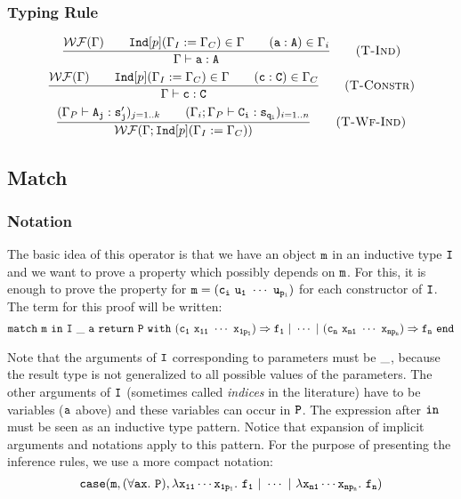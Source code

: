 \subsubsection{Typing Rule}
\begin{equation*}
\frac{\mathcal{WF}(\Gamma)\qquad {\tt Ind}[p](\Gamma_I:=\Gamma_C)\in \Gamma\qquad {\tt(a:A)}\in\Gamma_i}
    {\Gamma\vdash\tt a:A}
    \tag{\sc T-Ind}
\end{equation*}
\begin{equation*}
\frac{\mathcal{WF}(\Gamma)\qquad {\tt Ind}[p](\Gamma_I:=\Gamma_C)\in \Gamma\qquad {\tt (c:C)}\in\Gamma_C}
    {\Gamma\vdash\tt c:C}
    \tag{\sc T-Constr}
\end{equation*}
\begin{equation*}
\frac{(\Gamma_P\vdash{\tt A_j:s_j'})_{j=1..k}\qquad (\Gamma_i;\Gamma_P\vdash{\tt C_i:s_{q_i}})_{i=1..n}}
    {\mathcal{WF}(\Gamma;{\tt Ind}[p](\Gamma_I:=\Gamma_C))}
    \tag{\sc T-Wf-Ind}
\end{equation*}


\subsection{Match}

\subsubsection{Notation}
The basic idea of this operator is that we have an object $\tt m$ in an inductive type $\tt I$ and we want
to prove a property which possibly depends on $\tt m$. For this, it is enough to prove the property for
$\tt m=(c_i\ u_1\ \cdots\ u_{p_i})$ for each constructor of $\tt I$.
The term for this proof will be written:
$$
\tt match\ m\ in\ I\ \_\ a\ return\ P\ with\ (c_1\ x_{11}\ \cdots\ x_{1p_1})\Rightarrow f_1\ |\ \cdots\ |\ (c_n\ x_{n1}\ \cdots\ x_{np_n})\Rightarrow
f_n\ end
$$\par
Note that the arguments of $\tt I$ corresponding to parameters must be $\tt\_$, because the result type is not 
generalized to all possible values of the parameters. The other arguments of $\tt I$ (sometimes called \textit{indices}
in the literature) have to be variables ($\tt a$ above) and these variables can occur in $\tt P$. The expression after 
$\tt in$ must be seen as an inductive type pattern. Notice that expansion of implicit arguments and notations apply 
to this pattern. For the purpose of presenting the inference rules, we use a more compact notation:
$$
\tt case(m,(\forall ax.\ P),\lambda x_{11}\cdots x_{1p_1}.\ f_1\ |\ \cdots\ |\ \lambda x_{n1}\cdots x_{np_n}.\ f_n)
$$

